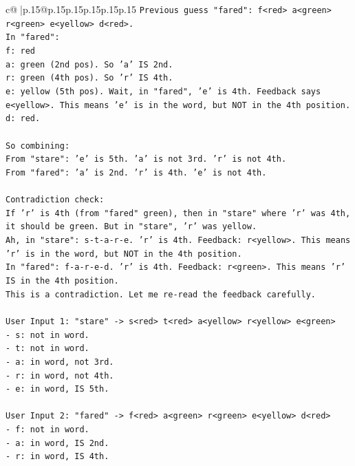 \documentclass{article}
\begin{document}
{\begin{supertabular}{c@{$\;$}|p{.15\linewidth}@{}p{.15\linewidth}p{.15\linewidth}p{.15\linewidth}p{.15\linewidth}p{.15\linewidth}}
{{{\texttt{Previous guess "fared": f<red> a<green> r<green> e<yellow> d<red>.} \\
\texttt{In "fared":} \\
\texttt{f: red} \\
\texttt{a: green (2nd pos). So 'a' IS 2nd.} \\
\texttt{r: green (4th pos). So 'r' IS 4th.} \\
\texttt{e: yellow (5th pos). Wait, in "fared", 'e' is 4th. Feedback says e<yellow>. This means 'e' is in the word, but NOT in the 4th position.} \\
\texttt{d: red.} \\
\\ 
\texttt{So combining:} \\
\texttt{From "stare": 'e' is 5th. 'a' is not 3rd. 'r' is not 4th.} \\
\texttt{From "fared": 'a' is 2nd. 'r' is 4th. 'e' is not 4th.} \\
\\ 
\texttt{Contradiction check:} \\
\texttt{If 'r' is 4th (from "fared" green), then in "stare" where 'r' was 4th, it should be green. But in "stare", 'r' was yellow.} \\
\texttt{Ah, in "stare": s{-}t{-}a{-}r{-}e. 'r' is 4th. Feedback: r<yellow>. This means 'r' is in the word, but NOT in the 4th position.} \\
\texttt{In "fared": f{-}a{-}r{-}e{-}d. 'r' is 4th. Feedback: r<green>. This means 'r' IS in the 4th position.} \\
\texttt{This is a contradiction. Let me re{-}read the feedback carefully.} \\
\\ 
\texttt{User Input 1: "stare" {-}> s<red> t<red> a<yellow> r<yellow> e<green>} \\
\texttt{{-} s: not in word.} \\
\texttt{{-} t: not in word.} \\
\texttt{{-} a: in word, not 3rd.} \\
\texttt{{-} r: in word, not 4th.} \\
\texttt{{-} e: in word, IS 5th.} \\
\\ 
\texttt{User Input 2: "fared" {-}> f<red> a<green> r<green> e<yellow> d<red>} \\
\texttt{{-} f: not in word.} \\
\texttt{{-} a: in word, IS 2nd.} \\
\texttt{{-} r: in word, IS 4th.} \\
}}}
\end{supertabular}}
\end{document}
